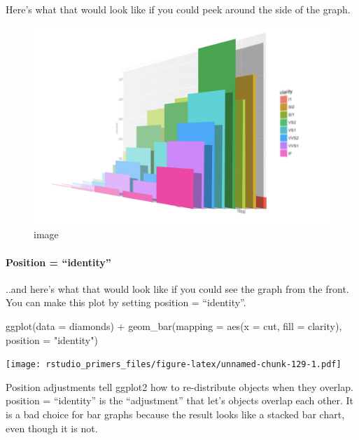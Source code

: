 \documentclass[
]{article}
\newenvironment{Shaded}{\begin{snugshade}}{\end{snugshade}}
\newcommand{\AttributeTok}[1]{\textcolor[rgb]{0.77,0.63,0.00}{#1}}
\newcommand{\FunctionTok}[1]{\textcolor[rgb]{0.00,0.00,0.00}{#1}}
\newcommand{\NormalTok}[1]{#1}
\newcommand{\SpecialCharTok}[1]{\textcolor[rgb]{0.00,0.00,0.00}{#1}}
\newcommand{\StringTok}[1]{\textcolor[rgb]{0.31,0.60,0.02}{#1}}
\begin{document}
Here's what that would look like if you could peek around the side of
the graph.

\begin{figure}
\centering
\includegraphics{data/positions-3.png}
\caption{image}
\end{figure}

\hypertarget{position-identity}{%
\paragraph{Position = ``identity''}\label{position-identity}}

..and here's what that would look like if you could see the graph from
the front. You can make this plot by setting position = ``identity''.

\begin{Shaded}
\begin{Highlighting}[]
\FunctionTok{ggplot}\NormalTok{(}\AttributeTok{data =}\NormalTok{ diamonds) }\SpecialCharTok{+}
  \FunctionTok{geom\_bar}\NormalTok{(}\AttributeTok{mapping =} \FunctionTok{aes}\NormalTok{(}\AttributeTok{x =}\NormalTok{ cut, }\AttributeTok{fill =}\NormalTok{ clarity), }\AttributeTok{position =} \StringTok{"identity"}\NormalTok{)}
\end{Highlighting}
\end{Shaded}

\texttt{[image: rstudio\_primers\_files/figure-latex/unnamed-chunk-129-1.pdf]}

Position adjustments tell ggplot2 how to re-distribute objects when they
overlap. position = ``identity'' is the ``adjustment'' that let's
objects overlap each other. It is a bad choice for bar graphs because
the result looks like a stacked bar chart, even though it is not.
\end{document}
